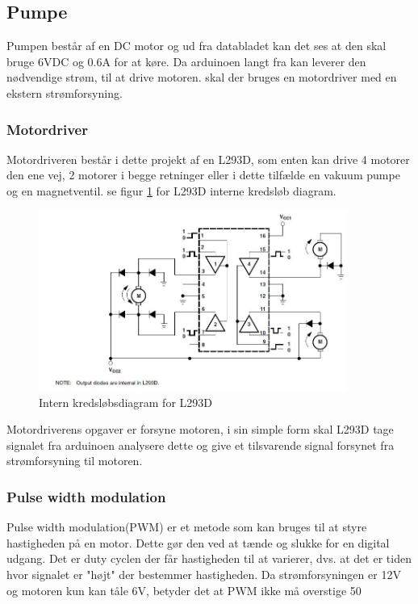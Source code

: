  \subsection{Pumpe}
 Pumpen består af en DC motor og ud fra databladet kan det ses at den skal bruge 6VDC og 0.6A for at køre. Da arduinoen langt fra kan leverer den nødvendige strøm, til at drive motoren. skal der bruges en motordriver med en ekstern strømforsyning.
 \subsubsection{Motordriver}
 Motordriveren består i dette projekt af en L293D, som enten kan drive 4 motorer den ene vej, 2 motorer i begge retninger eller i dette tilfælde en vakuum pumpe og en magnetventil. se figur \ref{fig:motordriverdiagram} for L293D interne kredsløb diagram. 
   \begin{figure}[H]
	\centering
	\includegraphics[width=0.9\textwidth]{billeder/Hardware/diagrammer/L293intern.JPG}
	\caption{Intern kredsløbsdiagram for L293D}
	\label{fig:motordriverdiagram}
\end{figure}
Motordriverens opgaver er forsyne motoren, i sin simple form skal L293D tage signalet fra arduinoen analysere dette og give et tilsvarende signal forsynet fra strømforsyning til motoren. 
\subsubsection{Pulse width modulation}
Pulse width modulation(PWM) er et metode som kan bruges til at styre hastigheden på en motor. Dette gør den ved at tænde og slukke for en digital udgang. Det er duty cyclen der får hastigheden til at varierer, dvs. at det er tiden hvor signalet er "højt" der bestemmer hastigheden. Da strømforsyningen er 12V og motoren kun kan tåle 6V, betyder det at PWM ikke må overstige 50%
